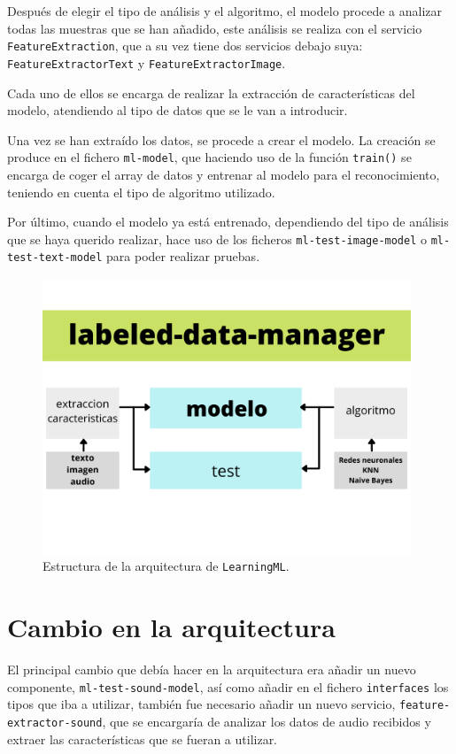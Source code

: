 \documentclass[a4paper, 12pt]{book}
\begin{document}
Después de elegir el tipo de análisis y el algoritmo, el modelo procede a analizar todas las muestras que se han añadido, este análisis se realiza con el servicio \texttt{FeatureExtraction}, que a su vez tiene dos servicios debajo suya: \texttt{FeatureExtractorText} y \texttt{FeatureExtractorImage}.

Cada uno de ellos se encarga de realizar la extracción de características del modelo, atendiendo al tipo de datos que se le van a introducir.

Una vez se han extraído los datos, se procede a crear el modelo. La creación se produce en el fichero \texttt{ml-model}, que haciendo uso de la función \texttt{train()} se encarga de coger el array de datos y entrenar al modelo para el reconocimiento, teniendo en cuenta el tipo de algoritmo utilizado.

Por último, cuando el modelo ya está entrenado, dependiendo del tipo de análisis que se haya querido realizar, hace uso de los ficheros \texttt{ml-test-image-model} o \texttt{ml-test-text-model} para poder realizar pruebas.

\begin{figure}
	\centering
	\includegraphics[width=11cm, keepaspectratio]{img/arquitectura-learningml.png}
	\caption{Estructura de la arquitectura de \texttt{LearningML}.}\label{fig:arquitectura}
\end{figure}

\section{Cambio en la arquitectura}
\label{sec:cambio-arquitectura}

El principal cambio que debía hacer en la arquitectura era añadir un nuevo componente, \texttt{ml-test-sound-model}, así como añadir en el fichero \texttt{interfaces} los tipos que iba a utilizar, también fue necesario añadir un nuevo servicio, \texttt{feature-extractor-sound}, que se encargaría de analizar los datos de audio recibidos y extraer las características que se fueran a utilizar.
\end{document}
